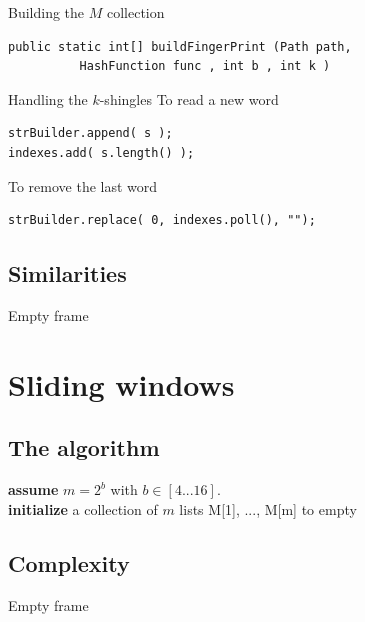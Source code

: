 \documentclass{beamer}
\begin{document}
\begin{frame}[fragile]
\begin{block}{Building the $M$ collection}
\begin{verbatim}
public static int[] buildFingerPrint (Path path,
          HashFunction func , int b , int k )
\end{verbatim}

\end{block}

\begin{block}{Handling the $k$-shingles}
To read a new word
\begin{verbatim}
strBuilder.append( s );
indexes.add( s.length() );
\end{verbatim}
To remove the last word
\begin{verbatim}
strBuilder.replace( 0, indexes.poll(), "");
\end{verbatim}
\end{block}

\end{frame}



\subsection{Similarities}
\begin{frame}
Empty frame
\end{frame}



\section{Sliding windows}

\subsection{The algorithm}
\begin{frame}
\textbf{assume} $m = 2^b$ with $b\in[4...16]$.\\
\textbf{initialize} a collection of $m$ lists M[1], ..., M[m] to empty\\


\end{frame}

\subsection{Complexity}
\begin{frame}
Empty frame
\end{frame}
\end{document}
